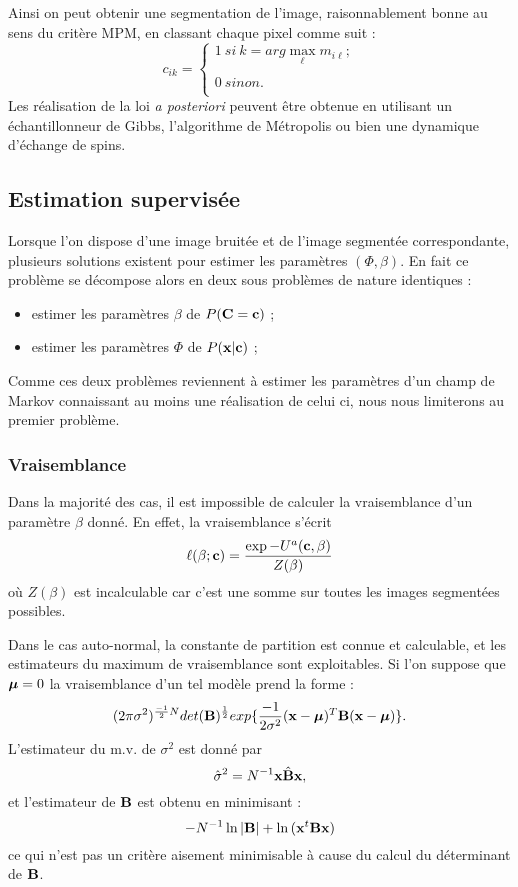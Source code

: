 Ainsi on peut obtenir une segmentation de l'image, raisonnablement
bonne au sens du crit\`ere MPM,  en classant  chaque pixel comme suit : 
\[
{c_{ik}}=
\left \{ \begin{array}{l}
1 \ si \ k=arg \max_{\ell} m_{i \ell};  \\
                              \\
0 \ sinon.\\
\end{array}
\right .
\]
Les r\'ealisation de la loi {\em a posteriori} peuvent \^etre obtenue
en utilisant un \'echantillonneur de Gibbs, l'algorithme de M\'etropolis
ou bien une dynamique d'\'echange de spins.

\subsection{Estimation supervis\'ee}

Lorsque l'on dispose d'une image bruit\'ee et de l'image segment\'ee 
correspondante, plusieurs solutions existent pour estimer les 
param\`etres $(\Phi, \beta)$. En fait ce probl\`eme se d\'ecompose
alors en deux sous probl\`emes de nature identiques :
\begin{itemize}
\item
estimer les param\`etres $\beta$ de $P(\mbox{\bf C}=\mbox{\bf c})$ ; 
\item
estimer les param\`etres $\Phi$ de $P(\mbox{\bf x}|\mbox{\bf c})$ ;
\end{itemize}

Comme ces deux probl\`emes reviennent \`a estimer les param\`etres d'un
champ de Markov connaissant  au moins une r\'ealisation de celui ci, nous 
nous limiterons au premier probl\`eme.


\subsubsection{Vraisemblance}

Dans la majorit\'e des cas, il est impossible de calculer la vraisemblance
d'un param\`etre $\beta$ donn\'e. En effet, la vraisemblance s'\'ecrit 
$$
\ell(\beta;\mbox{\bf c})= \frac{ \exp{-U^a(\mbox{\bf c},\beta)}}{Z(\beta)} 
$$
o\`u $Z(\beta)$ est incalculable car c'est une somme sur
toutes les images segment\'ees possibles. 

Dans le cas auto-normal, la constante de partition est connue et 
calculable, et les estimateurs du maximum de vraisemblance 
sont exploitables. Si l'on suppose que $\mbox{\boldmath $\mu$}=0$ la vraisemblance
d'un tel mod\`ele prend la forme :
$$
(2\pi\sigma^2)^{\frac{-1}{2}N} det(\mbox{\bf B})^{\frac{1}{2}} 
 exp\{\frac{-1}{2\sigma^2}(\mbox{\bf x}-\mbox{\boldmath $\mu$})^T\mbox{\bf B}(\mbox{\bf x}-\mbox{\boldmath $\mu$})\}.
$$
L'estimateur du m.v. de $\sigma^2$ est donn\'e par
$$
\hat{\sigma}^2=N^{-1} \mbox{\bf x} \hat{\mbox{\bf B}}\mbox{\bf x},
$$
et l'estimateur de $\mbox{\bf B}$ est obtenu en minimisant :
$$
-N^{-1} \ln |\mbox{\bf B} | + \ln{(\mbox{\bf x}^t \mbox{\bf B}\mbox{\bf x})}
$$
ce qui n'est pas un crit\`ere aisement minimisable \`a cause du 
calcul du d\'eterminant de $\mbox{\bf B}$.

